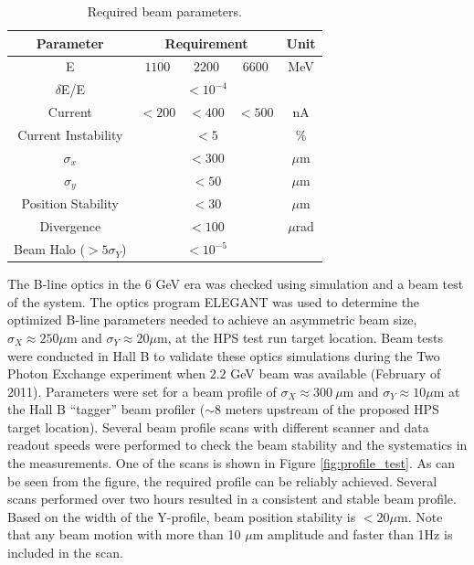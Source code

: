  \begin{table}[!htb]
 \centering
 \begin{tabular}{|c|c|c|c|c|}
\hline
Parameter & \multicolumn{3}{c|}{Requirement} &Unit \\ \hline 
E & $1100$ & $2200$ & $6600$ & MeV \\ \hline
$\delta$E/E & \multicolumn{3}{c|}{$< 10^{-4}$} & \\ \hline 
Current & $< 200$ & $< 400$ & $< 500$ & nA \\ \hline
Current Instability & \multicolumn{3}{c|}{$< 5$} &\% \\ \hline 
$\sigma_x $& \multicolumn{3}{c|}{$< 300$ } & $\mu$m \\ \hline 
$\sigma_y$&\multicolumn{3}{c|}{$<50$} & $\mu$m \\ \hline
Position Stability & \multicolumn{3}{c|}{$< 30$} &$\mu$m \\ \hline
Divergence& \multicolumn{3}{c|}{$< 100$} & $\mu$rad \\ \hline 
Beam Halo ($> 5\sigma_Y$) & \multicolumn{3}{c|}{$< 10^{-5}$} & \\ \hline
 \end{tabular}
\caption{ Required beam parameters.} 
\label{tb:beam}
\end{table}

The B-line optics in the $6$ GeV era was checked using simulation and a beam test of the system. The optics program ELEGANT \cite{elegant} was 
used to determine the optimized B-line parameters needed to achieve an asymmetric beam size, $\sigma_X \approx 250 \mu$m and $\sigma_Y\approx 
20 \mu$m, at the HPS test run target location. 
Beam tests were conducted in Hall B to validate these optics simulations during the Two Photon Exchange experiment when $2.2$ GeV beam was 
available (February of 2011). Parameters were set for a beam profile of $\sigma_X \approx 300 ~\mu$m and $\sigma_Y\approx 10 \mu$m at the 
Hall B ``tagger'' beam profiler ($\sim 8$ meters upstream of the proposed HPS target location). Several beam profile scans with different 
scanner and data readout speeds were performed to check the beam stability and the systematics in the measurements. 
One of the scans is shown in Figure \ref{fig:profile_test}. As can be seen from the figure, the required profile can be reliably  achieved. 
Several scans performed over two hours resulted in a consistent and stable beam profile. Based on the width of the Y-profile, beam position 
stability is  $< 20 \mu$m. Note that any beam motion with more than 10 $\mu$m amplitude and faster than 1Hz is included in the scan.

